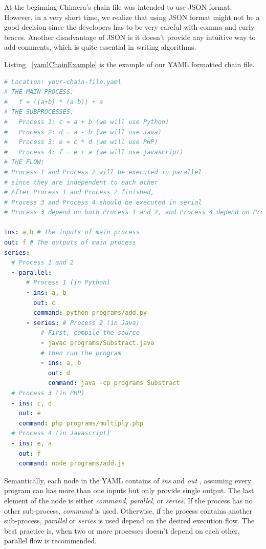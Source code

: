 \documentclass[conference]{IEEEtran}
\begin{document}
At the beginning Chimera's chain file was intended to use JSON format. However, in
a very short time, we realize that using JSON format might not be a good decision since
the developers has to be very careful with comma and curly braces. Another disadvantage
of JSON is it doesn't provide any intuitive way to add comments, which is quite
essential in writing algorithms.

Listing ~\ref{yamlChainExample} is the example of our YAML formatted chain file.

\begin{lstlisting}[caption=YAML Chain Example, label=yamlChainExample, language=yaml, basicstyle=\small, breaklines=true]
# Location: your-chain-file.yaml 
# THE MAIN PROCESS: 
#   f = ((a+b) * (a-b)) + a 
# THE SUBPROCESSES: 
#   Process 1: c = a + b (we will use Python) 
#   Process 2: d = a - b (we will use Java) 
#   Process 3: e = c * d (we will use PHP) 
#   Process 4: f = e + a (we will use javascript) 
# THE FLOW: 
# Process 1 and Process 2 will be executed in parallel 
# since they are independent to each other 
# After Process 1 and Process 2 finished, 
# Process 3 and Process 4 should be executed in serial  
# Process 3 depend on both Process 1 and 2, and Process 4 depend on Process 3 
 
ins: a,b # The inputs of main process 
out: f # The outputs of main process 
series:
  # Process 1 and 2 
  - parallel:
      # Process 1 (in Python) 
      - ins: a, b
        out: c
        command: python programs/add.py
      - series: # Process 2 (in Java) 
          # First, compile the source  
          - javac programs/Substract.java
          # then run the program 
          - ins: a, b
            out: d
            command: java -cp programs Substract
  # Process 3 (in PHP) 
  - ins: c, d
    out: e
    command: php programs/multiply.php
  # Process 4 (in Javascript) 
  - ins: e, a
    out: f
    command: node programs/add.js
\end{lstlisting}

Semantically, each node in the YAML contains of {\it ins} and {\it out }, assuming
every program can has more than one inputs but only provide single output. The last
element of the node is either {\it command}, {\it parallel}, or {\it series}. 
If the process has no other sub-process, {\it command} is used. Otherwise, if the
process contains another sub-process, {\it parallel} or {\it series} is used depend
on the desired execution flow. The best practice is, when two or more processes
doesn't depend on each other, parallel flow is recommended.
\end{document}

